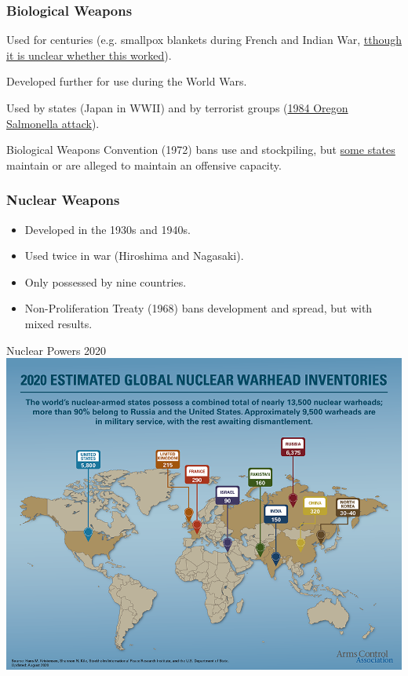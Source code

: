 \documentclass[handout]{beamer}
\begin{document}
\begin{frame} 
\frametitle{\LARGE{Biological Weapons}}
\begin{itemize}
	\large{
		\item Used for centuries (e.g. smallpox blankets during French and Indian War, \href{https://www.history.com/news/colonists-native-americans-smallpox-blankets}{tthough it is unclear whether this worked}). \pause
		\item Developed further for use during the World Wars. \pause
		\item Used by states (Japan in WWII) and by terrorist groups (\href{https://en.wikipedia.org/wiki/1984_Rajneeshee_bioterror_attack}{1984 Oregon Salmonella attack}). \pause 
		\item Biological Weapons Convention (1972) bans use and stockpiling, but \href{https://www.armscontrol.org/factsheets/cbwprolif}{some states} maintain or are alleged to maintain an offensive capacity.
	}
\end{itemize}
\end{frame}

\begin{frame} 
\frametitle{\LARGE{Nuclear Weapons}}
\begin{itemize}
		\item Developed in the 1930s and 1940s. \pause
		\item Used twice in war (Hiroshima and Nagasaki). \pause
		\item Only possessed by nine countries. \pause 
		\item Non-Proliferation Treaty (1968) bans development and spread, but with mixed results.
\end{itemize}
\end{frame}

 \begin{frame}{\LARGE Nuclear Powers 2020}
    \centering
\includegraphics[width=\textwidth,height=0.9\textheight,keepaspectratio]{warheads.png}
\end{frame}
\end{document}
